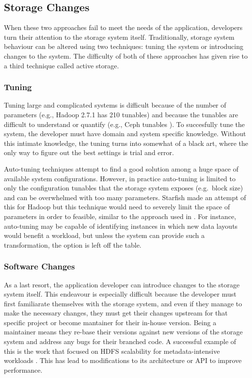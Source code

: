 \documentclass[10pt,twocolumn]{article}
\begin{document}
\subsection{Storage Changes}\label{storage-changes}

When these two approaches fail to meet the needs of the application,
developers turn their attention to the storage system itself.
Traditionally, storage system behaviour can be altered using two
techniques: tuning the system or introducing changes to the system. The
difficulty of both of these approaches has given rise to a third
technique called active storage.

\subsubsection{Tuning}\label{tuning}

Tuning large and complicated systems is difficult because of the number
of parameters (e.g., Hadoop 2.7.1 has 210 tunables) and because the
tunables are difficult to understand or quantify (e.g., Ceph tunables
\autocite{sevilla:sc15-mantle}). To succesfully tune the system, the
developer must have domain and system specific knowledge. Without this
intimate knowledge, the tuning turns into somewhat of a black art, where
the only way to figure out the best settings is trial and error.

Auto-tuning techniques attempt to find a good solution among a huge
space of available system configurations. However, in practice
auto-tuning is limited to only the configuration tunables that the
storage system exposes (e.g.~block size) and can be overwhelmed with too
many parameters. Starfish \autocite{herodotou:cidr2011-starfish} made an
attempt of this for Hadoop but this technique would need to severely
limit the space of parameters in order to feasible, similar to the
approach used in \autocite{behzad:sc2013-autotuning}. For instance,
auto-tuning may be capable of identifying instances in which new data
layouts would benefit a workload, but unless the system can provide such
a transformation, the option is left off the table.

\subsubsection{Software Changes}\label{software-changes}

As a last resort, the application developer can introduce changes to the
storage system itself. This endeavour is especially difficult because
the developer must first familiarate themselves with the storage system,
and even if they manage to make the necessary changes, they must get
their changes upstream for that specific project or become mantainer for
their in-house version. Being a maintainer means they re-base their
versions against new versions of the storage system and address any bugs
for their branched code. A successful example of this is the work that
focused on HDFS scalability for metadata-intensive workloads
\autocite{shvachko_hdfs_2010}. This has lead to modifications to its
architecture or API \autocite{balmin:sigmod2012-clydesdale} to improve
performance.
\end{document}
